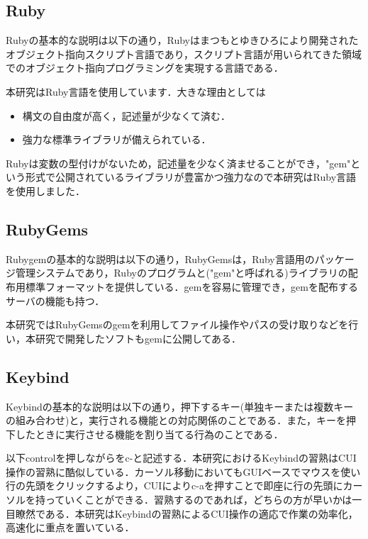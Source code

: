 \documentclass[11pt,dvipdfmx]{jsarticle}
\providecommand{\tightlist}{%
      \setlength{\itemsep}{0pt}\setlength{\parskip}{0pt}}
\begin{document}
    \subsection{Ruby}\label{ruby}

Rubyの基本的な説明は以下の通り，Rubyはまつもとゆきひろにより開発されたオブジェクト指向スクリプト言語であり，スクリプト言語が用いられてきた領域でのオブジェクト指向プログラミングを実現する言語である．

本研究はRuby言語を使用しています．大きな理由としては

\begin{itemize}
\tightlist
\item
  構文の自由度が高く，記述量が少なくて済む．
\item
  強力な標準ライブラリが備えられている．
\end{itemize}

Rubyは変数の型付けがないため，記述量を少なく済ませることができ，"gem"という形式で公開されているライブラリが豊富かつ強力なので本研究はRuby言語を使用しました．

    \subsection{RubyGems}\label{rubygems}

Rubygemの基本的な説明は以下の通り，RubyGemsは，Ruby言語用のパッケージ管理システムであり，Rubyのプログラムと("gem"と呼ばれる)ライブラリの配布用標準フォーマットを提供している．gemを容易に管理でき，gemを配布するサーバの機能も持つ．

本研究ではRubyGemsのgemを利用してファイル操作やパスの受け取りなどを行い，本研究で開発したソフトもgemに公開してある．

    \subsection{Keybind}\label{keybind}

Keybindの基本的な説明は以下の通り，押下するキー(単独キーまたは複数キーの組み合わせ)と，実行される機能との対応関係のことである．また，キーを押下したときに実行させる機能を割り当てる行為のことである．

以下controlを押しながらをc-と記述する．本研究におけるKeybindの習熟はCUI操作の習熟に酷似している．カーソル移動においてもGUIベースでマウスを使い行の先頭をクリックするより，CUIによりc-aを押すことで即座に行の先頭にカーソルを持っていくことができる．習熟するのであれば，どちらの方が早いかは一目瞭然である．本研究はKeybindの習熟によるCUI操作の適応で作業の効率化，高速化に重点を置いている．
\end{document}
